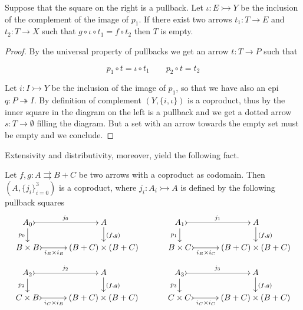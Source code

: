 \documentclass[3p]{elsarticle}
\def\X{\textbf {\textup{X}}}
\newcommand{\mto}{\rightarrowtail}
\newcommand{\eto}{\twoheadrightarrow}
\theoremstyle{remark}
\theoremstyle{definition}
\begin{document}
\noindent 
\begin{minipage}[l]{.83\linewidth}
\begin{prop}\label{prop:isempty}
	Suppose that the square on the right is a pullback. Let $\iota \colon E\mto Y$ be the inclusion of the complement of the image of $p_1$. If there exist two  arrows $t_1\colon T\to E$ and $t_2\colon T\to X$ such that $g\circ \iota\circ t_1= f\circ t_2$ then $T$ is empty.
\end{prop}
\end{minipage}
\hfill
\begin{minipage}[r]{.2\linewidth}
\end{minipage}
\begin{proof}
	By the universal property of pullbacks we get an arrow $t\colon T\to P$ such that 
	
	\noindent
	\begin{minipage}[l]{.3\linewidth}
	\end{minipage}\hfill
	\begin{minipage}[r]{.78\linewidth}	\setlength{\parindent}{1.5em}
		\[p_1\circ t=\iota \circ t_1 \qquad p_2\circ t=t_2\]
		
Let $i\colon I\mto Y$ be the inclusion of the image of $p_1$, so that we have also an epi $q\colon P\eto I$. By definition of complement $(Y, \{i, \iota\})$ is a coproduct, thus by   the inner square in the diagram on the left is a pullback and we get a dotted arrow $s\colon T\to \emptyset$ filling the diagram. But a set with an arrow towards the empty set must be empty and we conclude. \qedhere 
	\end{minipage}
\end{proof}


Extensivity and distributivity, moreover, yield the following fact.

\begin{lem}\label{lem:nodim}
	Let $f,g\colon A\rightrightarrows B+C$ be two arrows with a coproduct as codomain. Then $(A, \{j_i\}_{i=0}^
	3)$ is a coproduct, where $j_i\colon A_i\mto A $ is defined by the following pullback squares
	\[\xymatrix@C=30pt@R=15pt{A_0 \ar@{>->}[r]^{j_0}  \ar[d]_{p_0}& A   \ar[d]^{(f,g)}& A_1 \ar@{>->}[r]^{j_1}  \ar[d]_{p_1} & A \ar[d]^{(f,g)} \\
		B\times B \ar@{>->}[r]_-{i_B\times i_B} & (B+C)\times (B+C) & B\times C \ar@{>->}[r]_-{i_B\times i_C} & (B+C)\times (B+C)}\]
	\[ \xymatrix@C=30pt@R=15pt{A_2 \ar@{>->}[r]^{j_2}  \ar[d]_{p_2}& A   \ar[d]^{(f,g)}& A_3 \ar@{>->}[r]^{j_3}  \ar[d]_{p_3} & A \ar[d]^{(f,g)} \\
		C\times B \ar@{>->}[r]_-{i_C\times i_B} & (B+C)\times (B+C) & C\times C \ar@{>->}[r]_-{i_C\times i_C} & (B+C)\times (B+C)}\]
\end{lem}
\end{document}
